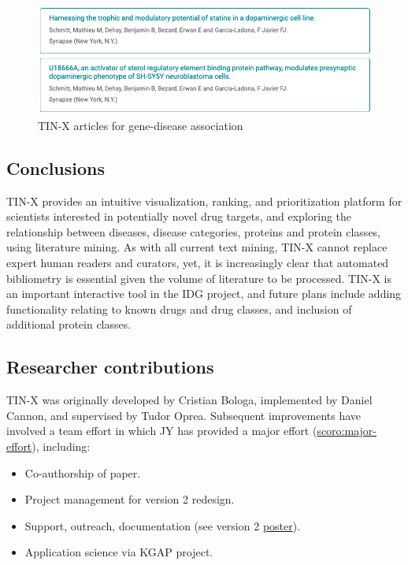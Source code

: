 \begin{figure}
    \centering
    \includegraphics[width=\linewidth]{figures/tinx/TINX_SYNRG3articles_rev2.png}
    \caption{TIN-X articles for gene-disease association}
    \label{fig:tinx_02}
\end{figure}

\subsection{Conclusions}

TIN-X provides an intuitive visualization, ranking, and prioritization platform for scientists interested in potentially novel drug targets, and exploring the relationship between diseases, disease categories, proteins and protein classes, using literature mining.  As with all current text mining, TIN-X cannot replace expert human readers and curators, yet, it is increasingly clear that automated bibliometry is essential given the volume of literature to be processed.  TIN-X is an important interactive tool in the IDG project, and future plans include adding functionality relating to known drugs and drug classes, and inclusion of additional protein classes. 

\subsection{Researcher contributions}

TIN-X was originally developed by Cristian Bologa, implemented by Daniel Cannon, and supervised by Tudor Oprea. Subsequent improvements have involved a team effort in which JY has provided a major effort (\href{http://purl.org/spar/scoro/major-effort}{scoro:major-effort}), including:

\begin{itemize}[topsep=0pt,itemsep=0pt,partopsep=0pt,parsep=0pt]
    \item Co-authorship of paper.
    \item Project management for version 2 redesign.
    \item Support, outreach, documentation (see version 2 \href{https://zenodo.org/record/5038628}{poster}).
    \item Application science via KGAP project.
\end{itemize}
